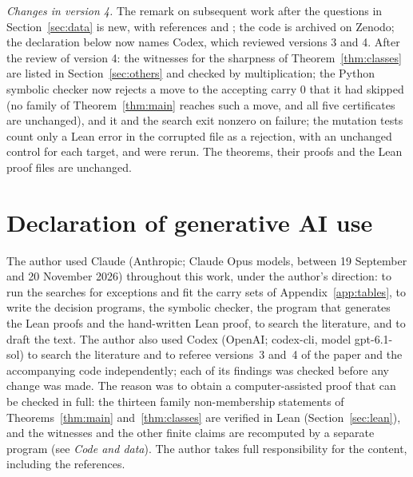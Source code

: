 \documentclass[11pt]{amsart}
\theoremstyle{definition}
\begin{document}
\emph{Changes in version 4.} The remark on subsequent work after the questions in Section~\ref{sec:data} is new,
with references \cite{Patel} and \cite{Iuz}; the code is archived on Zenodo; the declaration below now names
Codex, which reviewed versions 3 and 4. After the review of version 4: the witnesses for the sharpness of
Theorem~\ref{thm:classes} are listed in Section~\ref{sec:others} and checked by multiplication; the Python
symbolic checker now rejects a move to the accepting carry $0$ that it had skipped (no family of
Theorem~\ref{thm:main} reaches such a move, and all five certificates are unchanged), and it and the search
exit nonzero on failure; the mutation tests count only a Lean error in the corrupted file as a rejection, with
an unchanged control for each target, and were rerun. The theorems, their proofs and the Lean proof files
are unchanged.

\section*{Declaration of generative AI use}
The author used Claude (Anthropic; Claude Opus models, between 19 September and 20 November 2026)
throughout this work, under the author's direction: to run the searches for exceptions and fit the carry sets
of Appendix~\ref{app:tables}, to write the decision programs, the symbolic checker, the program that
generates the Lean proofs and the hand-written Lean proof, to search the literature, and to draft the
text. The author also used Codex (OpenAI; codex-cli, model gpt-6.1-sol) to search the literature and to referee
versions~3 and~4 of the paper and the accompanying code independently; each of its findings was checked before
any change was made. The reason was to obtain a computer-assisted proof that can be checked in full: the thirteen
family non-membership statements of Theorems~\ref{thm:main} and~\ref{thm:classes} are verified in Lean (Section~\ref{sec:lean}), and the witnesses and the other finite claims are
recomputed by a separate program (see \emph{Code and data}). The author takes full responsibility for the content, including
the references.
\end{document}
